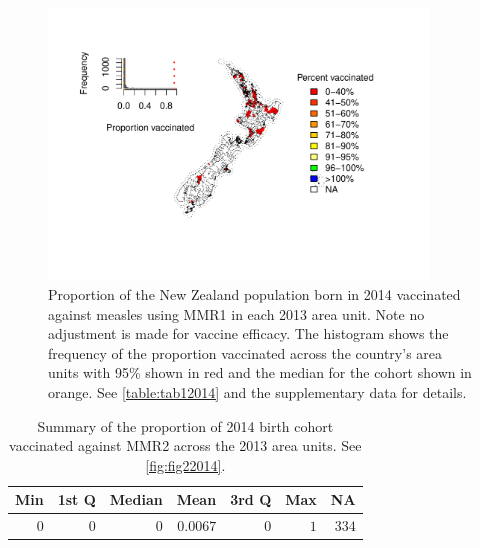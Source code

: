 \documentclass{article}
\begin{document}
\begin{figure}
\begin{center}
    \includegraphics[width=0.9\textwidth]{nir_census_MMR1_NIR_2014.pdf}
 \end{center}
    \caption{Proportion of the New Zealand population born in 2014 vaccinated against measles using MMR1 in each 2013 area unit. Note no adjustment is made for vaccine efficacy. The histogram shows the frequency of the proportion vaccinated across the country's area units with 95\% shown in red and the median for the cohort shown in orange. See \autoref{table:tab12014} and the supplementary data for details.}
\label{fig:fig12014}
\end{figure}

 \vspace{5mm} %
\begin{table}
\begin{center}
\begin{tabular}{rrrrrrr}
\hline\hline
\multicolumn{1}{c}{Min}&\multicolumn{1}{c}{1st Q}&\multicolumn{1}{c}{Median}&\multicolumn{1}{c}{Mean}&\multicolumn{1}{c}{3rd Q}&\multicolumn{1}{c}{Max}&\multicolumn{1}{c}{NA}\tabularnewline
\hline
$0$&$0$&$0$&$0.0067$&$0$&$1$&$334$\tabularnewline
\hline
\end{tabular}\end{center}\caption{Summary of the proportion of 2014 birth cohort vaccinated against MMR2 across the 2013 area units. See \autoref{fig:fig22014}.}
\label{table:tab22014}
\end{table}
\end{document}
